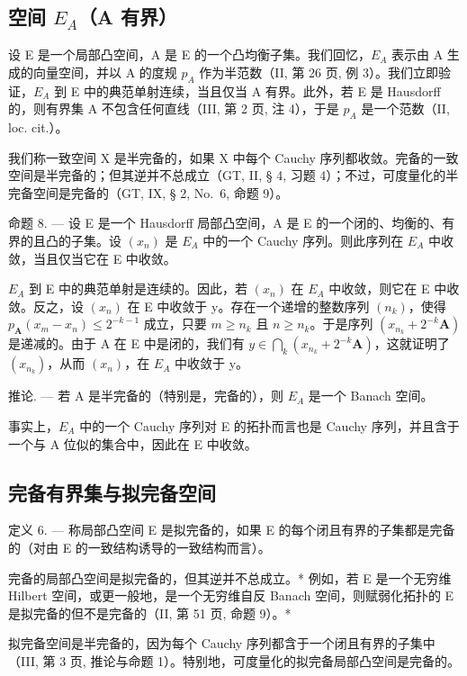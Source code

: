\subsection{\texorpdfstring{空间 \(E_{A}\)（A 有界）}{空间 E\_\{A\}（A 有界）}}

设 E 是一个局部凸空间，A 是 E 的一个凸均衡子集。我们回忆，\(E_{A}\) 表示由 A 生成的向量空间，并以 A 的度规 \(p_{A}\) 作为半范数（II, 第 26 页, 例 3）。我们立即验证，\(E_{A}\) 到 E 中的典范单射连续，当且仅当 A 有界。此外，若 E 是 Hausdorff 的，则有界集 A 不包含任何直线（III, 第 2 页, 注 4），于是 \(p_{A}\) 是一个范数（II, loc. cit.）。

我们称一致空间 X 是半完备的，如果 X 中每个 Cauchy 序列都收敛。完备的一致空间是半完备的；但其逆并不总成立（GT, II, § 4, 习题 4）；不过，可度量化的半完备空间是完备的（GT, IX, § 2, No.~6, 命题 9）。

命题 8. --- 设 E 是一个 Hausdorff 局部凸空间，A 是 E 的一个闭的、均衡的、有界的且凸的子集。设 \((x_{n})\) 是 \(E_{A}\) 中的一个 Cauchy 序列。则此序列在 \(E_{A}\) 中收敛，当且仅当它在 E 中收敛。

\(E_{A}\) 到 E 中的典范单射是连续的。因此，若 \((x_{n})\) 在 \(E_{A}\) 中收敛，则它在 E 中收敛。反之，设 \((x_{n})\) 在 E 中收敛于 y。存在一个递增的整数序列 \((n_{k})\)，使得 \(p_{\mathbf{A}}(x_{m}-x_{n}) \leqslant 2^{-k-1}\) 成立，只要 \(m \geqslant n_{k}\) 且 \(n \geqslant n_{k}\)。于是序列 \((x_{n_{k}} + 2^{-k}\mathbf{A})\) 是递减的。由于 A 在 E 中是闭的，我们有 \(y \in \bigcap_{k} (x_{n_{k}} + 2^{-k}\mathbf{A})\)，这就证明了 \((x_{n_{k}})\)，从而 \((x_{n})\)，在 \(E_{A}\) 中收敛于 y。

推论. --- 若 A 是半完备的（特别是，完备的），则 \(E_{A}\) 是一个 Banach 空间。

事实上，\(E_{A}\) 中的一个 Cauchy 序列对 E 的拓扑而言也是 Cauchy 序列，并且含于一个与 A 位似的集合中，因此在 E 中收敛。

\subsection{完备有界集与拟完备空间}

定义 6. --- 称局部凸空间 E 是拟完备的，如果 E 的每个闭且有界的子集都是完备的（对由 E 的一致结构诱导的一致结构而言）。

完备的局部凸空间是拟完备的，但其逆并不总成立。* 例如，若 E 是一个无穷维 Hilbert 空间，或更一般地，是一个无穷维自反 Banach 空间，则赋弱化拓扑的 E 是拟完备的但不是完备的（II, 第 51 页, 命题 9）。*

拟完备空间是半完备的，因为每个 Cauchy 序列都含于一个闭且有界的子集中（III, 第 3 页, 推论与命题 1）。特别地，可度量化的拟完备局部凸空间是完备的。

